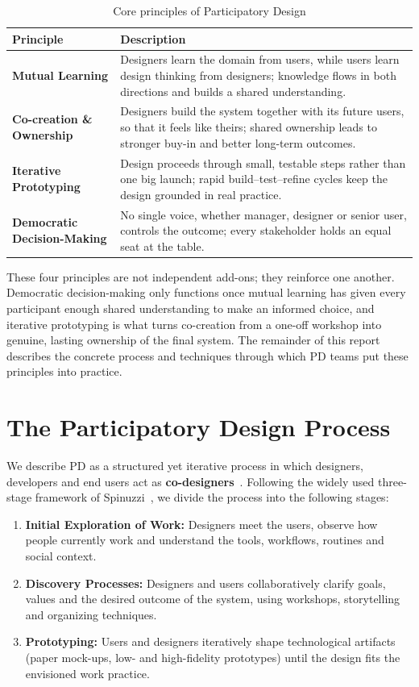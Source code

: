 \documentclass[a4paper,12pt]{article}
\begin{document}
\begin{table}[H]
\centering
\begin{tabularx}{\textwidth}{@{}>{\bfseries}l X@{}}
\toprule
\rowcolor{myblue!20} Principle & Description \\
\midrule
Mutual Learning & Designers learn the domain from users, while users learn design thinking from designers; knowledge flows in both directions and builds a shared understanding. \\
Co-creation \& Ownership & Designers build the system together with its future users, so that it feels like theirs; shared ownership leads to stronger buy-in and better long-term outcomes. \\
Iterative Prototyping & Design proceeds through small, testable steps rather than one big launch; rapid build--test--refine cycles keep the design grounded in real practice. \\
Democratic Decision-Making & No single voice, whether manager, designer or senior user, controls the outcome; every stakeholder holds an equal seat at the table. \\
\bottomrule
\end{tabularx}
\caption{Core principles of Participatory Design}
\label{tab:principles}
\end{table}

These four principles are not independent add-ons; they reinforce one another. Democratic decision-making only functions once mutual learning has given every participant enough shared understanding to make an informed choice, and iterative prototyping is what turns co-creation from a one-off workshop into genuine, lasting ownership of the final system. The remainder of this report describes the concrete process and techniques through which PD teams put these principles into practice.

\section{The Participatory Design Process}
We describe PD as a structured yet iterative process in which
designers, developers and end users act as \textbf{co-designers}~\cite{schuler1993,sanders2008}. Following the widely
used three-stage framework of Spinuzzi~\cite{spinuzzi2005}, we divide the process into the following stages:

\begin{enumerate}
    \item \textbf{Initial Exploration of Work:} Designers meet the users, observe how people currently work and understand the tools, workflows, routines and social context.
    \item \textbf{Discovery Processes:} Designers and users collaboratively clarify goals, values and the desired outcome of the system, using workshops, storytelling and organizing techniques.
    \item \textbf{Prototyping:} Users and designers iteratively shape technological artifacts (paper mock-ups, low- and high-fidelity prototypes) until the design fits the envisioned work practice.
\end{enumerate}
\end{document}
